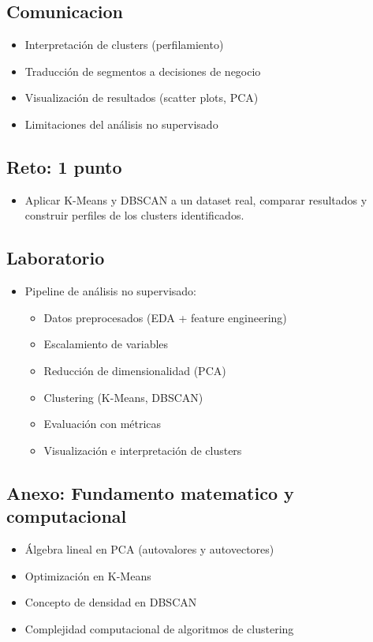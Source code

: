 \documentclass[12pt,a4paper,openany,oneside]{book}
\begin{document}
\begin{itemize}
\subsection{Comunicacion}
\begin{itemize}
    \item Interpretación de clusters (perfilamiento)
    \item Traducción de segmentos a decisiones de negocio
    \item Visualización de resultados (scatter plots, PCA)
    \item Limitaciones del análisis no supervisado
\end{itemize}

\subsection{Reto: 1 punto}
\begin{itemize}
    \item Aplicar K-Means y DBSCAN a un dataset real, comparar resultados y construir perfiles de los clusters identificados.
\end{itemize}

\subsection{Laboratorio}
\begin{itemize}
    \item Pipeline de análisis no supervisado:
    \begin{itemize}
        \item Datos preprocesados (EDA + feature engineering)
        \item Escalamiento de variables
        \item Reducción de dimensionalidad (PCA)
        \item Clustering (K-Means, DBSCAN)
        \item Evaluación con métricas
        \item Visualización e interpretación de clusters
    \end{itemize}
\end{itemize}

\subsection{Anexo: Fundamento matematico y computacional}
\begin{itemize}
    \item Álgebra lineal en PCA (autovalores y autovectores)
    \item Optimización en K-Means
    \item Concepto de densidad en DBSCAN
    \item Complejidad computacional de algoritmos de clustering
\end{itemize}


\end{itemize}
\end{document}
